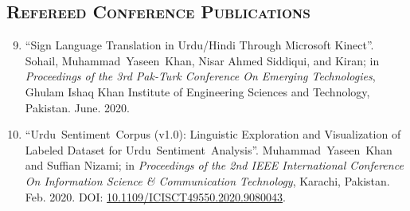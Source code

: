 \documentclass[a4paper, 10pt]{article}
\begin{document}
\subsection*{\normalfont\textsc{Refereed Conference Publications}}
\begin{enumerate}
\setcounter{enumi}{8}
\itemsep-4pt 








\item ``Sign Language Translation in Urdu/Hindi Through Microsoft Kinect''. Sohail, \textcolor{NavyBlue}{Muhammad~Yaseen~Khan}, Nisar Ahmed Siddiqui, and Kiran; in \emph{Proceedings of the 3rd Pak-Turk Conference On Emerging Technologies}, Ghulam Ishaq Khan Institute of Engineering Sciences and Technology, Pakistan. June. 2020.

\item ``Urdu~Sentiment~Corpus (v1.0): Linguistic Exploration and Visualization of Labeled Dataset for Urdu~Sentiment~Analysis''. \textcolor{NavyBlue}{Muhammad~Yaseen~Khan} and Suffian Nizami; in \emph{Proceedings of the 2nd IEEE International Conference On Information Science \& Communication Technology}, Karachi, Pakistan. Feb. 2020. DOI: \url{10.1109/ICISCT49550.2020.9080043}.


\end{enumerate}
\end{document}
